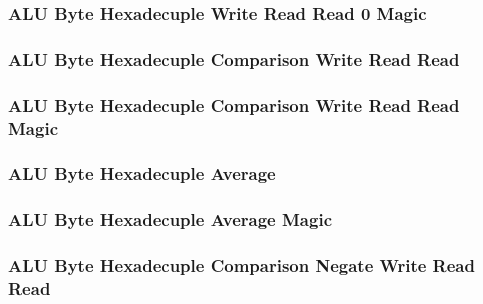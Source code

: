 \subsubsection[{\small ALU Byte Hexadecuple Write Read Read 0 Magic}]{ALU Byte Hexadecuple Write Read Read 0 Magic} \label{sec:format-ALU-BXWRR0.M}



\subsubsection[{\small ALU Byte Hexadecuple Comparison Write Read Read}]{ALU Byte Hexadecuple Comparison Write Read Read} \label{sec:format-ALU-BXCWRR}



\subsubsection[{\small ALU Byte Hexadecuple Comparison Write Read Read Magic}]{ALU Byte Hexadecuple Comparison Write Read Read Magic} \label{sec:format-ALU-BXCWRR.M}



\subsubsection[{\small ALU Byte Hexadecuple Average}]{ALU Byte Hexadecuple Average} \label{sec:format-ALU-BXAVG}



\subsubsection[{\small ALU Byte Hexadecuple Average Magic}]{ALU Byte Hexadecuple Average Magic} \label{sec:format-ALU-BXAVG.M}



\subsubsection[{\small ALU Byte Hexadecuple Comparison Negate Write Read Read}]{ALU Byte Hexadecuple Comparison Negate Write Read Read} \label{sec:format-ALU-BXCNWRR}


